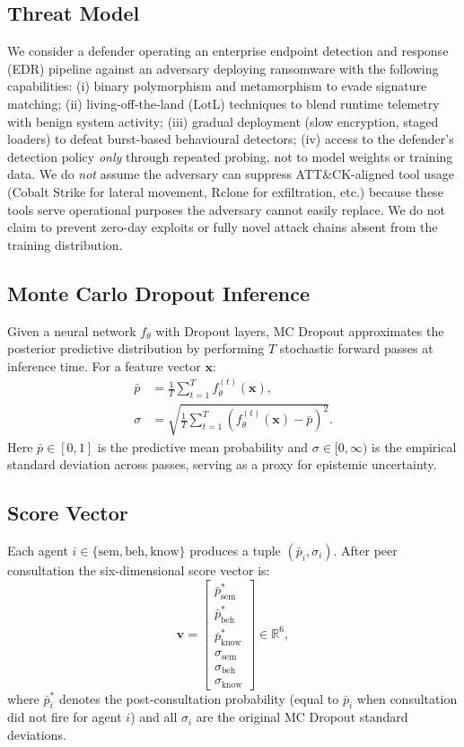\documentclass[journal]{IEEEtran}
\newcommand{\sem}{\mathrm{sem}}
\newcommand{\beh}{\mathrm{beh}}
\newcommand{\know}{\mathrm{know}}
\begin{document}
\subsection{Threat Model}
We consider a defender operating an enterprise endpoint detection and
response (EDR) pipeline against an adversary deploying ransomware with
the following capabilities:
(i) binary polymorphism and metamorphism to evade signature matching;
(ii) living-off-the-land (LotL) techniques to blend runtime telemetry
with benign system activity;
(iii) gradual deployment (slow encryption, staged loaders) to defeat
burst-based behavioural detectors;
(iv) access to the defender's detection policy \emph{only} through
repeated probing, not to model weights or training data.
We do \emph{not} assume the adversary can suppress ATT\&CK-aligned tool
usage (Cobalt Strike for lateral movement, Rclone for exfiltration,
etc.) because these tools serve operational purposes the adversary
cannot easily replace.
We do not claim to prevent zero-day exploits or fully novel
attack chains absent from the training distribution.

\subsection{Monte Carlo Dropout Inference}
Given a neural network $f_\theta$ with Dropout layers, MC Dropout
approximates the posterior predictive distribution by performing $T$
stochastic forward passes at inference time.
For a feature vector $\mathbf{x}$:
\begin{align}
\bar{p} &= \frac{1}{T}\sum_{t=1}^{T} f_{\theta}^{(t)}(\mathbf{x}),
\label{eq:mc_mean}\\
\sigma  &= \sqrt{\frac{1}{T}\sum_{t=1}^{T}\left(f_{\theta}^{(t)}(\mathbf{x})
           - \bar{p}\right)^2}.
\label{eq:mc_std}
\end{align}
Here $\bar{p}\in[0,1]$ is the predictive mean probability and
$\sigma\in[0,\infty)$ is the empirical standard deviation across passes,
serving as a proxy for epistemic uncertainty.

\subsection{Score Vector}
Each agent $i\in\{\sem,\beh,\know\}$ produces a tuple
$(\bar{p}_i, \sigma_i)$.
After peer consultation the six-dimensional score vector is:
\begin{equation}
\mathbf{v} =
\begin{bmatrix}
\bar{p}_\sem^* \\ \bar{p}_\beh^* \\ \bar{p}_\know^* \\
\sigma_\sem   \\ \sigma_\beh   \\ \sigma_\know
\end{bmatrix}
\in \mathbb{R}^6,
\label{eq:scorevec}
\end{equation}
where $\bar{p}_i^*$ denotes the post-consultation probability
(equal to $\bar{p}_i$ when consultation did not fire for agent $i$)
and all $\sigma_i$ are the original MC Dropout standard deviations.
\end{document}
